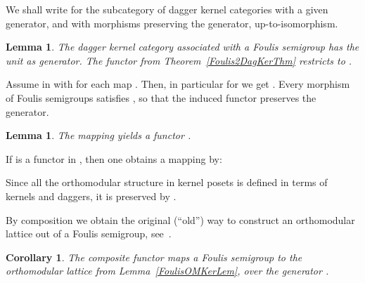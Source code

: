 \documentclass{article}
\newtheorem{lemma}[theorem]{Lemma}
\newtheorem{corollary}[theorem]{Corollary}
\newenvironment{proof}[1][Proof]{ \begin{trivlist}\item[\hskip \labelsep {\bfseries #1}]}{ \end{trivlist}}
\newcommand{\QED}{\hspace*{\fill}}
\begin{document}
We shall write  for the subcategory
of dagger kernel categories with a given generator, and with morphisms
preserving the generator, up-to-isomorphism.


\begin{lemma}
The dagger kernel category  associated with a Foulis
semigroup has the unit  as generator. The functor  from Theorem~\ref{Foulis2DagKerThm} restricts
to .
\end{lemma}


\begin{proof}
Assume  in  with  for each map . Then, in
particular for  we get . Every
morphism  of Foulis semigroups satisfies
, so that the induced functor  preserves the generator. \QED
\end{proof}



\begin{lemma}
The mapping  yields a functor
.
\end{lemma}


\begin{proof}
If  is a functor in ,
then one obtains a mapping 
by:


\noindent Since all the orthomodular structure in kernel posets
 is defined in terms of kernels and daggers, it is preserved
by . \QED
\end{proof}


By composition we obtain the original (``old'') way to construct an
orthomodular lattice out of a Foulis semigroup, see~\cite{Foulis63}.


\begin{corollary}
\label{Foulis2OMLatCor}
The composite functor  maps a Foulis semigroup  to the orthomodular lattice
 from
Lemma~\ref{FoulisOMKerLem}, over the generator . \QED
\end{corollary}
\end{document}
